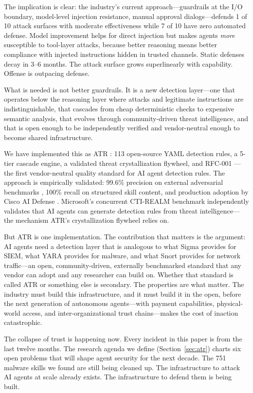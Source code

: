 \documentclass[11pt,letterpaper]{article}
\begin{document}
The implication is clear: the industry's current approach---guardrails at the I/O boundary, model-level injection resistance, manual approval dialogs---defends 1 of 10 attack surfaces with moderate effectiveness while 7 of 10 have zero automated defense. Model improvement helps for direct injection but makes agents \textit{more} susceptible to tool-layer attacks, because better reasoning means better compliance with injected instructions hidden in trusted channels. Static defenses decay in 3--6 months. The attack surface grows superlinearly with capability. Offense is outpacing defense.

What is needed is not better guardrails. It is a new detection layer---one that operates below the reasoning layer where attacks and legitimate instructions are indistinguishable, that cascades from cheap deterministic checks to expensive semantic analysis, that evolves through community-driven threat intelligence, and that is open enough to be independently verified and vendor-neutral enough to become shared infrastructure.

We have implemented this as ATR \cite{atr}: 113 open-source YAML detection rules, a 5-tier cascade engine, a validated threat crystallization flywheel, and RFC-001 \cite{rfc001}---the first vendor-neutral quality standard for AI agent detection rules. The approach is empirically validated: 99.6\% precision on external adversarial benchmarks \cite{pint}, 100\% recall on structured skill content, and production adoption by Cisco AI Defense \cite{ciscopr79}. Microsoft's concurrent CTI-REALM benchmark \cite{ctirealm} independently validates that AI agents can generate detection rules from threat intelligence---the mechanism ATR's crystallization flywheel relies on.

But ATR is one implementation. The contribution that matters is the argument: AI agents need a detection layer that is analogous to what Sigma provides for SIEM, what YARA provides for malware, and what Snort provides for network traffic---an open, community-driven, externally benchmarked standard that any vendor can adopt and any researcher can build on. Whether that standard is called ATR or something else is secondary. The properties are what matter. The industry must build this infrastructure, and it must build it in the open, before the next generation of autonomous agents---with payment capabilities, physical-world access, and inter-organizational trust chains---makes the cost of inaction catastrophic.

The collapse of trust is happening now. Every incident in this paper is from the last twelve months. The research agenda we define (Section~\ref{sec:atr}) charts six open problems that will shape agent security for the next decade. The 751 malware skills we found are still being cleaned up. The infrastructure to attack AI agents at scale already exists. The infrastructure to defend them is being built.
\end{document}
